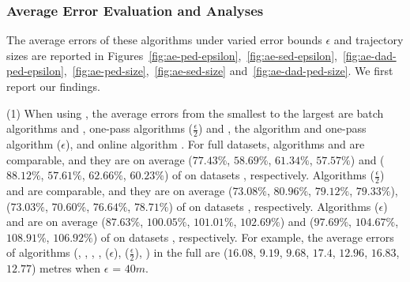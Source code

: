 \subsubsection{Average Error Evaluation and Analyses}
The average errors of these algorithms under varied error bounds $\epsilon$ and trajectory sizes are reported in Figures~\ref{fig:ae-ped-epsilon},~\ref{fig:ae-sed-epsilon},~\ref{fig:ae-dad-ped-epsilon},~\ref{fig:ae-ped-size},~\ref{fig:ae-sed-size} and~\ref{fig:ae-dad-ped-size}.
We first report our findings.

\sstab (1) When using \ped, the average errors from the smallest
to the largest are batch algorithms \tpa and \dpa, one-pass
algorithms \siped($\frac{\epsilon}{2}$) and \operb, the \opt algorithm and one-pass algorithm \siped(${\epsilon}$), and online algorithm \bqsa.
%
For full datasets, algorithms \tpa and \dpa are comparable, and they are on average ($77.43\%$, $58.69\%$, $61.34\%$,
$57.57\%$) and ($88.12\%$, $57.61\%$, $62.66\%$, $60.23\%$) of \opt on datasets \dSets, respectively.
Algorithms \siped($\frac{\epsilon}{2}$) and \operb are comparable, and they are on average
($73.08\%$, $80.96\%$, $79.12\%$, $79.33\%$), ($73.03\%$, $70.60\%$, $76.64\%$, $78.71\%$) of \opt on datasets \dSets, respectively.
%
Algorithms \siped(${\epsilon}$) and \bqsa are on average ($87.63\%$, $100.05\%$, $101.01\%$, $102.69\%$) and ($97.69\%$, $104.67\%$, $108.91\%$, $106.92\%$) of \opt on datasets \dSets, respectively.
For example, the average errors of algorithms
(\opt, \tpa, \dpa, \bqsa, \siped(${\epsilon}$), \siped($\frac{\epsilon}{2}$), \operb ) in the full \mopsi are ($16.08$, $9.19$, $9.68$, $17.4$, $12.96$, $16.83$, $12.77$) metres when $\epsilon$ = $40m$.


